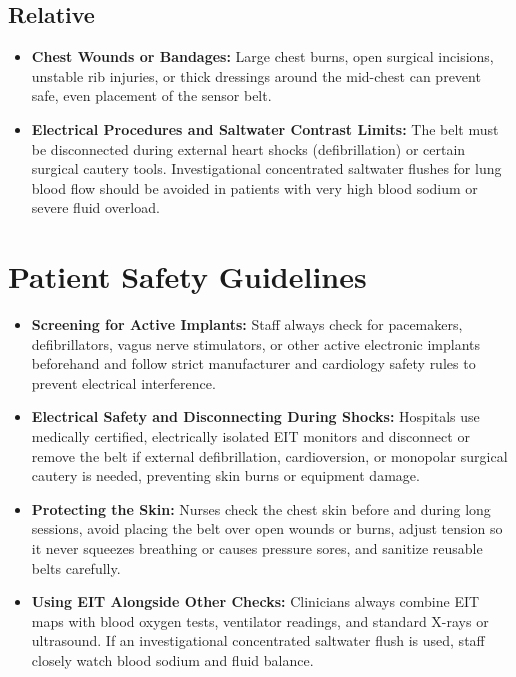 \subsection{Relative}
\begin{itemize}
    \item \textbf{Chest Wounds or Bandages:} Large chest burns, open surgical incisions, unstable rib injuries, or thick dressings around the mid-chest can prevent safe, even placement of the sensor belt.
    \item \textbf{Electrical Procedures and Saltwater Contrast Limits:} The belt must be disconnected during external heart shocks (defibrillation) or certain surgical cautery tools. Investigational concentrated saltwater flushes for lung blood flow should be avoided in patients with very high blood sodium or severe fluid overload.
\end{itemize}

\section{Patient Safety Guidelines}
\begin{itemize}
    \item \textbf{Screening for Active Implants:} Staff always check for pacemakers, defibrillators, vagus nerve stimulators, or other active electronic implants beforehand and follow strict manufacturer and cardiology safety rules to prevent electrical interference.
    \item \textbf{Electrical Safety and Disconnecting During Shocks:} Hospitals use medically certified, electrically isolated EIT monitors and disconnect or remove the belt if external defibrillation, cardioversion, or monopolar surgical cautery is needed, preventing skin burns or equipment damage.
    \item \textbf{Protecting the Skin:} Nurses check the chest skin before and during long sessions, avoid placing the belt over open wounds or burns, adjust tension so it never squeezes breathing or causes pressure sores, and sanitize reusable belts carefully.
    \item \textbf{Using EIT Alongside Other Checks:} Clinicians always combine EIT maps with blood oxygen tests, ventilator readings, and standard X-rays or ultrasound. If an investigational concentrated saltwater flush is used, staff closely watch blood sodium and fluid balance.
\end{itemize}

